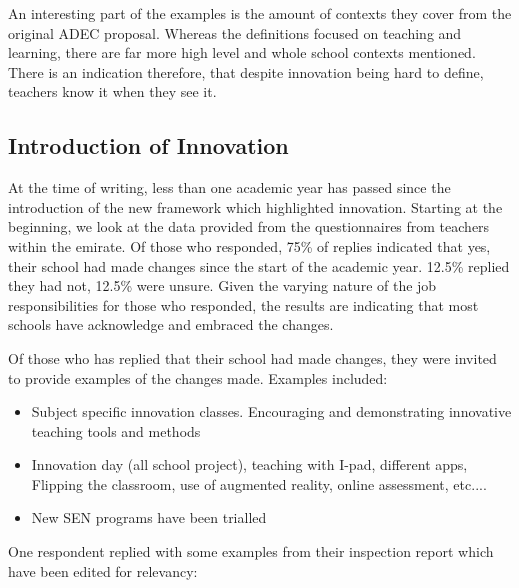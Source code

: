 \documentclass[11pt]{article}
\begin{document}
An interesting part of the examples is the amount of contexts they cover from the original ADEC proposal. Whereas the definitions focused on teaching and learning, there are far more high level and whole school contexts mentioned. There is an indication therefore, that despite innovation being hard to define, teachers know it when they see it.

\subsection{Introduction of Innovation}
At the time of writing, less than one academic year has passed since the introduction of the new framework which highlighted innovation. Starting at the beginning, we look at the data provided from the questionnaires from teachers within the emirate. Of those who responded, 75\% of replies indicated that yes, their school had made changes since the start of the academic year. 12.5\% replied they had not, 12.5\% were unsure. Given the varying nature of the job responsibilities for those who responded, the results are indicating that most schools have acknowledge and embraced the changes.

Of those who has replied that their school had made changes, they were invited to provide examples of the changes made. Examples included:

\begin{itemize}
	\item Subject specific innovation classes. Encouraging and demonstrating innovative teaching tools and methods
	\item Innovation day (all school project), teaching with I-pad, different apps, Flipping the classroom, use of augmented reality, online assessment, etc....
	\item New SEN programs have been trialled
\end{itemize}

One respondent replied with some examples from their inspection report which have been edited for relevancy:
\end{document}
